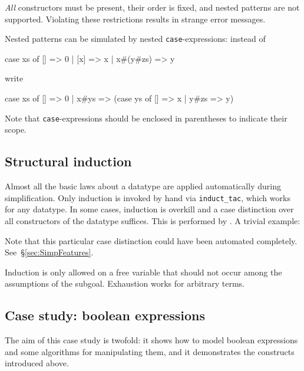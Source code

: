 \begin{warn}
{\em All} constructors must be present, their order is fixed, and nested
patterns are not supported.  Violating these restrictions results in strange
error messages.
\end{warn}
\noindent
Nested patterns can be simulated by nested \texttt{case}-expressions: instead
of
\begin{ttbox}
case xs of [] => 0 | [x] => x | x#(y#zs) => y
\end{ttbox}
write
\begin{ttbox}
case xs of [] => 0 | x#ys => (case ys of [] => x | y#zs => y)
\end{ttbox}
Note that \texttt{case}-expressions should be enclosed in parentheses to
indicate their scope.

\subsection{Structural induction}

Almost all the basic laws about a datatype are applied automatically during
simplification. Only induction is invoked by hand via \texttt{induct_tac},
which works for any datatype. In some cases, induction is overkill and a case
distinction over all constructors of the datatype suffices. This is performed
by . A trivial example:
\begin{ttbox}
\end{ttbox}
Note that this particular case distinction could have been automated
completely. See~\S\ref{sec:SimpFeatures}.

\begin{warn}
  Induction is only allowed on a free variable that should not occur among
  the assumptions of the subgoal.  Exhaustion works for arbitrary terms.
\end{warn}

\subsection{Case study: boolean expressions}
\label{sec:boolex}

The aim of this case study is twofold: it shows how to model boolean
expressions and some algorithms for manipulating them, and it demonstrates
the constructs introduced above.

